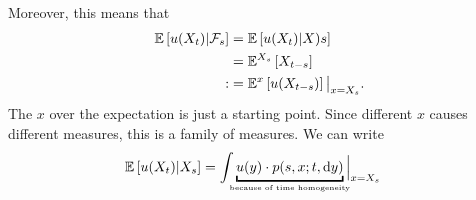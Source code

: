 Moreover, this means that
\begin{align*}
	\mathbb{E}\left[{u(X_t)|\mathcal{F}_s}\right]&=\mathbb{E}\left[{u(X_t)|X)s}\right]\\
	&=\mathbb{E}^{X_s}\left[X_{t-s}\right]\\
	:&=\mathbb{E}^{x}\left[u(X_{t-s})\right]\big|_{x=X_{s}}.
\end{align*}
The $x$ over the expectation is just a starting point. Since different $x$ causes different measures, this is a family of measures. We can write
\begin{align*}
	\ev{u(X_{t})|X_s}&=\int \underbracket{u(y)\cdot p(s,x;t,\dif y)}_{\mathclap{\text{\tiny because of time homogeneity}}}\Big|_{x=X_s}
\end{align*}

